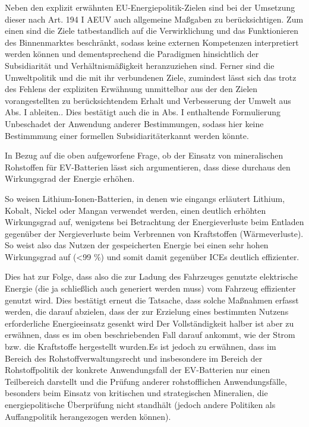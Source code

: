\documentclass[12pt,a4paper,oneside]{book} %
\begin{document}
Neben den explizit erwähnten EU-Energiepolitik-Zielen sind bei der Umsetzung dieser nach Art. 194 I AEUV auch allgemeine Maßgaben zu berücksichtigen. Zum einen sind die Ziele \glqq tatbestandlich auf die Verwirklichung und das Funktionieren des Binnenmarktes beschränkt\grqq \autocite{Bings in Streinz, Art. 194 Rn. 32f.}, sodass keine externen Kompetenzen interpretiert werden können\autocite{Bings in Streinz, Art. 194 Rn. 33} und dementsprechend die Paradigmen hinsichtlich der Subsidiarität und Verhältnismäßigkeit heranzuziehen sind. Ferner sind die Umweltpolitik und die mit ihr verbundenen Ziele, zumindest lässt sich das trotz des Fehlens der expliziten Erwähnung unmittelbar aus der den Zielen vorangestellten zu berücksichtendem Erhalt und Verbesserung der Umwelt aus Abs. I ableiten.\autocite{Bings in Streinz, Art. 194 Rn. 33}. Dies bestätigt auch die in Abs. I enthaltende Formulierung \glqq Unbeschadet der Anwendung anderer Bestimmungen\grqq, sodass hier keine Bestimmmung einer \glqq formellen Subsidiarität\grqq erkannt werden könnte.\autocite{Nettesheim, Grabitz/Hilf/nettesheim AEUV Art. 194, Rn 35}
	
In Bezug auf die oben aufgeworfene Frage, ob der Einsatz von mineralischen Rohstoffen für EV-Batterien lässt sich argumentieren, dass diese durchaus den Wirkungsgrad der Energie erhöhen. 
	
So weisen Lithium-Ionen-Batterien, in denen wie eingangs erläutert Lithium, Kobalt, Nickel oder Mangan verwendet werden, einen deutlich erhöhten Wirkungsgrad auf, wenigstens bei Betrachtung der Energieverluste beim Entladen gegenüber der Nergieverluste beim Verbrennen von Kraftstoffen (Wärmeverluste). So weist also das Nutzen der gespeicherten Energie bei einen sehr hohen Wirkungsgrad auf (<99 \%) und somit damit gegenüber ICEs deutlich effizienter.%

Dies hat zur Folge, dass also die zur Ladung des Fahrzeuges genutzte elektrische Energie (die ja schließlich auch generiert werden muss) vom Fahrzeug effizienter genutzt wird. Dies bestätigt erneut die Tatsache, dass solche Maßnahmen erfasst werden, die \glqq darauf abzielen, dass der zur Erzielung eines bestimmten Nutzens erforderliche Energieeinsatz gesenkt wird\grqq\autocite{Nettesheim in Grabitz/Hilf, AEUV Art. 194, Rn. 17}
Der Vollständigkeit halber ist aber zu erwähnen, dass es im oben beschriebenden Fall darauf ankommt, wie der Strom bzw. die Kraftstoffe hergestellt wurden.Es ist jedoch zu erwähnen, dass im Bereich des Rohstoffverwaltungsrecht und insbesondere im Bereich der Rohstoffpolitik der konkrete Anwendungsfall der EV-Batterien nur einen Teilbereich darstellt und die Prüfung anderer rohstofflichen Anwendungsfälle, besonders beim Einsatz von kritischen und strategischen Mineralien, die energiepolitische Überprüfung nicht standhält (jedoch andere Politiken als Auffangpolitik herangezogen werden können).
	
\end{document}
